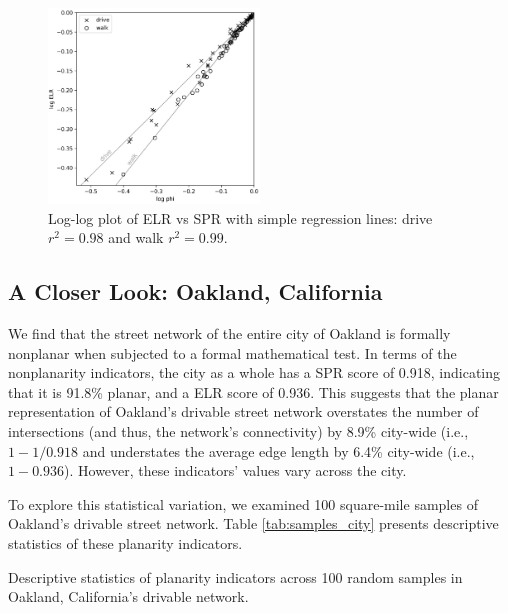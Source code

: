 \documentclass[Afour,sageh,times]{sagej}
\begin{document}
\begin{figure}[htbp]
    \center
    \includegraphics[width=0.5\textwidth]{regression_phi_split.png}
    \caption{Log-log plot of ELR vs SPR with simple regression lines: drive $r^2=0.98$ and walk $r^2=0.99$.}
    \label{fig:regression_split}
\end{figure}


\subsection{A Closer Look: Oakland, California}

We find that the street network of the entire city of Oakland is formally nonplanar when subjected to a formal mathematical test. In terms of the nonplanarity indicators, the city as a whole has a SPR score of 0.918, indicating that it is 91.8\% planar, and a ELR score of 0.936. This suggests that the planar representation of Oakland's drivable street network overstates the number of intersections (and thus, the network's connectivity) by 8.9\% city-wide (i.e., $1 - 1 / 0.918$ and understates the average edge length by 6.4\% city-wide (i.e., $1 - 0.936$). However, these indicators' values vary across the city.

To explore this statistical variation, we examined 100 square-mile samples of Oakland's drivable street network. Table \ref{tab:samples_city} presents descriptive statistics of these planarity indicators. 



\begin{table}[htbp]
\centering
\caption{Descriptive statistics of planarity indicators across 100 random samples in Oakland, California's drivable network.}
\label{tab:samples_city}

\end{table}
\end{document}
